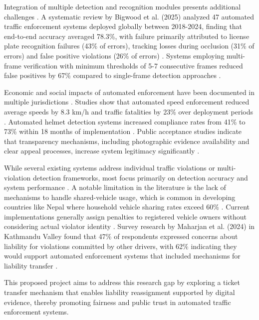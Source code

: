 \documentclass[12pt, a4paper, oneside]{memoir}
\begin{document}
Integration of multiple detection and recognition modules presents additional challenges \cite{bigwood2025review}. A systematic review by Bigwood et al. (2025) analyzed 47 automated traffic enforcement systems deployed globally between 2018-2024, finding that end-to-end accuracy averaged 78.3\%, with failure primarily attributed to license plate recognition failures (43\% of errors), tracking losses during occlusion (31\% of errors) and false positive violations (26\% of errors) \cite{bigwood2025review}. Systems employing multi-frame verification with minimum thresholds of 5-7 consecutive frames reduced false positives by 67\% compared to single-frame detection approaches \cite{bigwood2025review}.

Economic and social impacts of automated enforcement have been documented in multiple jurisdictions \cite{bigwood2025review}. Studies show that automated speed enforcement reduced average speeds by 8.3 km/h and traffic fatalities by 23\% over deployment periods \cite{bigwood2025review}. Automated helmet detection systems increased compliance rates from 41\% to 73\% within 18 months of implementation \cite{bigwood2025review}. Public acceptance studies indicate that transparency mechanisms, including photographic evidence availability and clear appeal processes, increase system legitimacy significantly \cite{bigwood2025review}.

While several existing systems address individual traffic violations or multi-violation detection frameworks, most focus primarily on detection accuracy and system performance \cite{ijarcce2026}. A notable limitation in the literature is the lack of mechanisms to handle shared-vehicle usage, which is common in developing countries like Nepal where household vehicle sharing rates exceed 60\% \cite{maharjan2024shaping}. Current implementations generally assign penalties to registered vehicle owners without considering actual violator identity \cite{nepalpolice2025}. Survey research by Maharjan et al. (2024) in Kathmandu Valley found that 47\% of respondents expressed concerns about liability for violations committed by other drivers, with 62\% indicating they would support automated enforcement systems that included mechanisms for liability transfer \cite{maharjan2024shaping}.

This proposed project aims to address this research gap by exploring a ticket transfer mechanism that enables liability reassignment supported by digital evidence, thereby promoting fairness and public trust in automated traffic enforcement systems.
\end{document}

